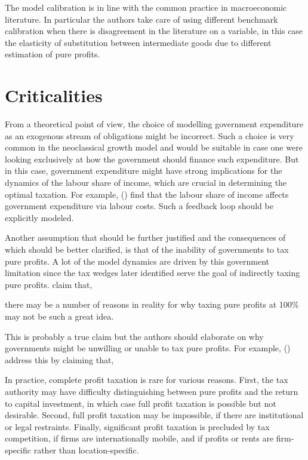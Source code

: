 \documentclass[american]{scrartcl}
\newcommand{\citein}[1]{\citeauthor{#1} (\citeyear{#1})}
\begin{document}
The model calibration is in line with the common practice in macroeconomic literature. In particular the authors take care of using different benchmark calibration when there is disagreement in the literature on a variable, in this case the elasticity of substitution between intermediate goods due to different estimation of pure profits.

\section{Criticalities}

From a theoretical point of view, the choice of modelling government expenditure as an exogenous stream of obligations might be incorrect. Such a choice is very common in the neoclassical growth model and would be suitable in case one were looking exclusively at how the government should finance such expenditure. But in this case, government expenditure might have strong implications for the dynamics of the labour share of income, which are crucial in determining the optimal taxation. For example, \citein{Facchini2016} find that the labour share of income affects government expenditure via labour costs. Such a feedback loop should be explicitly modeled.

Another assumption that should be further justified and the consequences of which should be better clarified, is that of the inability of governments to tax pure profits. A lot of the model dynamics are driven by this government limitation since the tax wedges later identified serve the goal of indirectly taxing pure profits. \citeauthor{Atesagaoglu2020} claim that,

\begin{displayquote}[p. 12]
    there may be a number of reasons in reality for why taxing pure profits at 100\% may not be such a great idea.
\end{displayquote}

This is probably a true claim but the authors should elaborate on why governments might be unwilling or unable to tax pure profits. For example, \citein{Huizinga1997} address this by claiming that,

\begin{displayquote}[p. 156]
    In practice, complete profit taxation is rare for various reasons. First, the tax authority may have difficulty distinguishing between pure profits and the return to capital investment, in which case full profit taxation is possible but not desirable. Second, full profit taxation may be impossible, if there are institutional or legal restraints. Finally, significant profit taxation is precluded by tax competition, if firms are internationally mobile, and if profits or rents are firm-specific rather than location-specific.
\end{displayquote}
\end{document}
